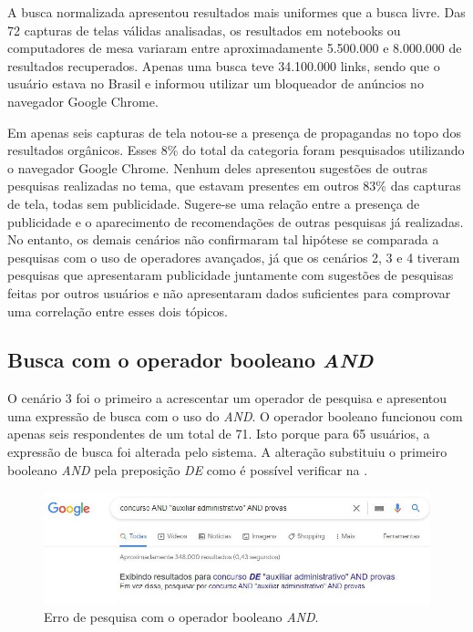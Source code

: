 \documentclass[portuguese]{textolivre}
\begin{document}
A busca normalizada apresentou resultados mais uniformes que a busca livre. Das 72 capturas de telas válidas analisadas, os resultados em notebooks ou computadores de mesa variaram entre aproximadamente 5.500.000 e 8.000.000 de resultados recuperados. Apenas uma busca teve 34.100.000 links, sendo que o usuário estava no Brasil e informou utilizar um bloqueador de anúncios no navegador Google Chrome.

Em apenas seis capturas de tela notou-se a presença de propagandas no topo dos resultados orgânicos. Esses 8\% do total da categoria foram pesquisados utilizando o navegador Google Chrome. Nenhum deles apresentou sugestões de outras pesquisas realizadas no tema, que estavam presentes em outros 83\% das capturas de tela, todas sem publicidade. Sugere-se uma relação entre a presença de publicidade e o aparecimento de recomendações de outras pesquisas já realizadas. No entanto, os demais cenários não confirmaram tal hipótese se comparada a pesquisas com o uso de operadores avançados, já que os cenários 2, 3 e 4 tiveram pesquisas que apresentaram publicidade juntamente com sugestões de pesquisas feitas por outros usuários e não apresentaram dados suficientes para comprovar uma correlação entre esses dois tópicos.

\subsection{Busca com o operador booleano \textit{AND}}\label{sec-secoes}
O cenário 3 foi o primeiro a acrescentar um operador de pesquisa e apresentou uma expressão de busca com o uso do \textit{AND}. O operador booleano funcionou com apenas seis respondentes de um total de 71. Isto porque para 65 usuários, a expressão de busca foi alterada pelo sistema. A alteração substituiu o primeiro booleano \textit{AND} pela preposição \textit{DE} como é possível verificar na .

\begin{figure}[h!]
    \centering
    \includegraphics[width=0.8\linewidth]{fig-012.jpg}
    \caption{Erro de pesquisa com o operador booleano \textit{AND}.}
    \label{fig16}
\end{figure}
\end{document}

